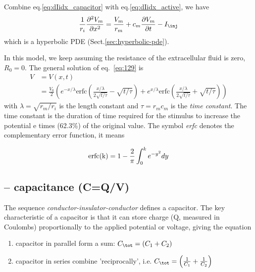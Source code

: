 Combine eq.\ref{eq:dIidx_capacitor} with eq.\ref{eq:dIidx_active}, we
have
\begin{equation}
  \label{eq:129}
  \frac{1}{r_i} \frac{\partial ^2V_m}{\partial x^2} = 
  \frac{V_m}{r_m} + c_m
  \frac{\partial V_m}{\partial t} - I_\inj
\end{equation}
which is a hyperbolic PDE (Sect.\ref{sec:hyperbolic-pde}).

\begin{mdframed}[linecolor=red!60!black,  linewidth=2pt]
In this model, we keep assuming the resistance of
the extracellular fluid is zero, $R_0 = 0$.
The general solution of eq.~\eqref{eq:129} is
\begin{equation}\label{eq:Vxt}
\begin{split}
  V &= V(x,t) \\ 
   &= \frac{V_0}{2}\left( e^{-x/\lambda}
    \text{erfc}(\frac{x/\lambda}{2\sqrt{t/\tau}}-\sqrt{t/\tau}) + e^{x/\lambda} \text{erfc}(\frac{x/\lambda}{2\sqrt{t/\tau}}+\sqrt{t/\tau}) \right)
\end{split}
\end{equation}
with $\lambda = \sqrt{r_m/r_i}$ is the length constant and 
$\tau =r_mc_m$ is the {\it time constant}. The time constant is the
  duration of time required for the stimulus to increase the potential
  e times (62.3\%) of the original value. The symbol {\it erfc} denotes the
complementary error function, it means

\begin{equation}
  \label{eq:130}
     \text{erfc(k)}= 1 -
  \frac{2}{\pi}
  \int_0^{k} e^{-y^2} dy
  \\
\end{equation}

\end{mdframed}


\subsection{-- capacitance (C=Q/V)}
\label{sec:capacitance}

The sequence {\it conductor-insulator-conductor} defines a capacitor. The key
characteristic of a capacitor is that it can store charge (Q, measured in
Coulombs) proportionally to the applied potential or voltage, giving the
equation
\begin{enumerate}
  \item capacitor in parallel form a sum: $C_\tot = \left(C_1 + C_2\right)$
  
  \item capacitor in series combine 'reciprocally', i.e.
  $C_\tot = \left(\frac{1}{C_1} + \frac{1}{C_2}\right)$
\end{enumerate}

